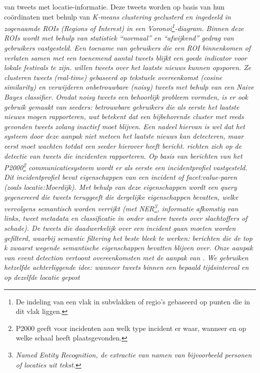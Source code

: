 {{van tweets met locatie-informatie. Deze tweets worden op basis van hun co\"ordinaten met behulp van \it{K-means clustering}
geclusterd en ingedeeld in zogenaamde \it{ROIs} (\it{Regions of Interest}) in een \it{Voronoi}\footnote{De indeling van een vlak in subvlakken of regio's gebaseerd op punten die in dit vlak liggen.}-diagram. 
Binnen deze ROIs wordt met behulp van statistiek ``normaal'' en ``afwijkend'' gedrag van gebruikers vastgesteld. Een toename van gebruikers die een ROI binnenkomen of verlaten samen met een toenemend
aantal tweets blijkt een goede indicator voor lokale festivals te zijn.
\vl
\citet{sankaranarayanan2009twitterstand} willen tweets over het laatste nieuws kunnen opsporen. Ze
clusteren tweets (real-time) gebaseerd op tekstuele overeenkomst (\it{cosine similarity}) en verwijderen onbetrouwbare (\it{noisy}) tweets met behulp van een 
\it{Naive Bayes classifier}. Omdat noisy tweets een behoorlijk probleem vormden, is er ook gebruik gemaakt van \it{seeders}:
betrouwbare gebruikers die als eerste het laatste nieuws mogen rapporteren, wat betekent dat een bijbehorende cluster met reeds gevonden tweets zolang inactief
moet blijven. Een nadeel hiervan is wel dat het systeem door deze aanpak niet meteen het laatste nieuws kan detecteren, maar eerst moet wachten totdat een seeder hierover heeft bericht.
\vl
\citet{abel2012twitcident} richten zich op de detectie van tweets die incidenten rapporteren. Op basis van berichten van het P2000\footnote{P2000 geeft voor incidenten aan welk type incident er waar, wanneer en op welke schaal heeft plaatsgevonden.}
communicatiesysteem wordt er als eerste een incidentprofiel vastgesteld. Dit incidentprofiel bevat eigenschappen van een incident of
\it{facet:value}-paren (zoals \it{locatie:Moerdijk}). Met behulp van deze eigenschappen wordt een query gegenereerd die tweets teruggeeft die 
dergelijke eigenschappen bevatten, welke vervolgens semantisch worden verrijkt (met \it{NER}\footnote{\it{Named Entity Recognition}, de extractie van namen van bijvoorbeeld personen of locaties uit tekst.}, 
informatie afkomstig van links, tweet metadata en classificatie in onder andere tweets over slachtoffers of schade). De tweets die 
daadwerkelijk over een incident gaan moeten worden gefilterd, waarbij \it{semantic filtering} het beste bleek te werken: berichten die de
top k zwaarst wegende semantische eigenschappen bevatten blijven over.
\vl
Onze aanpak van event detection vertoont overeenkomsten met de aanpak van 
\citet{walther2013geo}. We gebruiken hetzelfde achterliggende idee: wanneer tweets 
binnen een bepaald tijdsinterval en op dezelfde locatie gepost
}}

